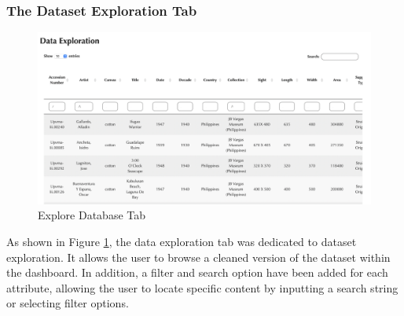 \documentclass[11pt, oneside]{article}
\begin{document}
\subsubsection{The Dataset Exploration Tab}
\begin{figure}[H]
    \centering
    \includegraphics[scale=0.3]{images/explore_data.png}
    \caption{Explore Database Tab}
    \label{explore_tab}
\end{figure}
As shown in Figure \ref{explore_tab}, the data exploration tab was dedicated to dataset exploration. It allows the user to browse a cleaned version of the dataset within the dashboard. In addition, a filter and search option have been added for each attribute, allowing the user to locate specific content by inputting a search string or selecting filter options.
\end{document}
